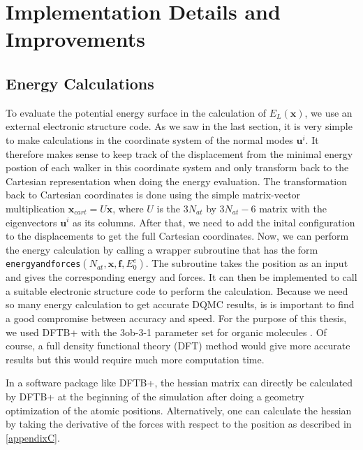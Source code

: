 \documentclass [12pt]{report}
\begin{document}
\section{Implementation Details and Improvements}
\subsection{Energy Calculations}
To evaluate the potential energy surface in the calculation of $E_L(\bm{x})$, we use an external electronic structure code. As we saw in the last section, it is very simple to make calculations in the coordinate system of the normal modes $\bm{u}^i$. It therefore makes sense to keep track of the displacement from the minimal energy postion of each walker in this coordinate system and only transform back to the Cartesian representation when doing the energy evaluation. The transformation back to Cartesian coordinates is done using the simple matrix-vector multiplication $\bm{x}_{cart} = U\bm{x}$, where $U$ is the $3N_{at}$ by $3N_{at} - 6$ matrix with the eigenvectors $\bm{u}^i$ as its columns. After that, we need to add the inital configuration to the displacements to get the full Cartesian coordinates. Now, we can perform the energy calculation by calling a wrapper subroutine that has the form \verb+energyandforces+$(N_{at},\bm{x},\bm{f},E^e_0)$. The subroutine takes the position as an input and gives the corresponding energy and forces. It can then be implemented to call a suitable electronic structure code to perform the calculation. Because we need so many energy calculation to get accurate DQMC results, is is important to find a good compromise between accuracy and speed. For the purpose of this thesis, we used DFTB+ \cite{dftbp,dftbp2} with the 3ob-3-1 parameter set for organic molecules \cite{3ob-3-1}. Of course, a full density functional theory (DFT) method would give more accurate results but this would require much more computation time.

In a software package like DFTB+, the hessian matrix can directly be calculated by DFTB+ at the beginning of the simulation after doing a geometry optimization of the atomic positions. Alternatively, one can calculate the hessian by taking the derivative of the forces with respect to the position as described in \ref{appendixC}.
\end{document}

